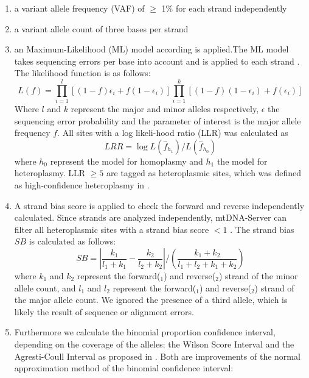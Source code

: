 \begin{enumerate}
\item  a variant allele frequency (VAF) of $\geq$ 1\% for each strand independently  
\item  a variant allele count of three bases per strand 
\item  an Maximum-Likelihood (ML) model according \cite{Ye2014} is applied.The ML model takes sequencing errors per base into account and is applied to each strand \cite{Weissensteiner2016b}. The likelihood function is as follows:
\begin{equation}
  L(f)=\prod_{i=1}^{l} [(1-f) \epsilon_{i} + f(1-\epsilon_i)] \prod_{i=1}^{k} [(1-f) (1- \epsilon_{i}) + f(\epsilon_i)] 
\end{equation}
Where $l$ and $k$ represent the major and minor alleles respectively, $\epsilon$ the sequencing error probability and the parameter of interest is the major allele frequency $f$. 
All sites with a log likeli-hood ratio (LLR) was calculated as 
\begin{equation}
  LRR=\log L({\widehat{f}_{h_1}}) /  L({\widehat{f}_{h_0}}) 
\end{equation}
where $h_0$ represent the model for homoplasmy and $h_1$ the model for heteroplasmy. LLR $\geq5$ are tagged as heteroplasmic sites, which was defined as high-confidence heteroplasmy in \cite{Picardi2012}. 
\item  A strand bias score is applied to check the forward and reverse independently calculated. Since strands are analyzed independently, mtDNA-Server can filter all heteroplasmic sites with a strand bias score $<1$ \cite{Weissensteiner2016b,Guo2012}. The strand bias $SB$ is calculated as follows:
\begin{equation}\label{eq:llr}
  SB=\left| \frac{k_1}{l_1+k_1} - \frac{k_2}{l_2+k_2} \right| / \left(\frac{k_1 + k_2}{l_1+l_2+k_1+k_2}\right)
\end{equation}
where $k_1$ and $k_2$ represent the forward($_1$) and reverse($_2$) strand of the minor allele count, and $l_1$ and $l_2$ represent the forward($_1$) and reverse($_2$) strand of the major allele count. We ignored the presence of a third allele, which is likely the result of sequence or alignment errors.
\item Furthermore we calculate the binomial proportion confidence interval, depending on the coverage of the alleles: the Wilson Score Interval and the Agresti-Coull Interval as proposed in \cite{Calabrese2014}. 
Both are improvements of the normal approximation method of the binomial confidence interval:

\end{enumerate}
